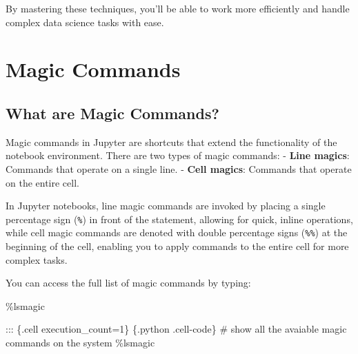 \documentclass[
  letterpaper,
  DIV=11,
  numbers=noendperiod]{scrreprt}
\newenvironment{Shaded}{\begin{snugshade}}{\end{snugshade}}
\newcommand{\CommentTok}[1]{\textcolor[rgb]{0.37,0.37,0.37}{#1}}
\newcommand{\DecValTok}[1]{\textcolor[rgb]{0.68,0.00,0.00}{#1}}
\newcommand{\NormalTok}[1]{\textcolor[rgb]{0.00,0.23,0.31}{#1}}
\newcommand{\OperatorTok}[1]{\textcolor[rgb]{0.37,0.37,0.37}{#1}}
\begin{document}
By mastering these techniques, you'll be able to work more efficiently
and handle complex data science tasks with ease.

\hypertarget{magic-commands}{%
\section{Magic Commands}\label{magic-commands}}

\hypertarget{what-are-magic-commands}{%
\subsection{What are Magic Commands?}\label{what-are-magic-commands}}

Magic commands in Jupyter are shortcuts that extend the functionality of
the notebook environment. There are two types of magic commands: -
\textbf{Line magics}: Commands that operate on a single line. -
\textbf{Cell magics}: Commands that operate on the entire cell.

In Jupyter notebooks, line magic commands are invoked by placing a
single percentage sign (\texttt{\%}) in front of the statement, allowing
for quick, inline operations, while cell magic commands are denoted with
double percentage signs (\texttt{\%\%}) at the beginning of the cell,
enabling you to apply commands to the entire cell for more complex
tasks.

You can access the full list of magic commands by typing:

\begin{Shaded}
\begin{Highlighting}[]
\OperatorTok{\%}\NormalTok{lsmagic}

\NormalTok{::: \{.cell execution\_count}\OperatorTok{=}\DecValTok{1}\NormalTok{\}}
\NormalTok{\textasciigrave{}\textasciigrave{}\textasciigrave{} \{.python .cell}\OperatorTok{{-}}\NormalTok{code\}}
\CommentTok{\# show all the avaiable magic commands on the system}
\OperatorTok{\%}\NormalTok{lsmagic}
\end{Highlighting}
\end{Shaded}
\end{document}
